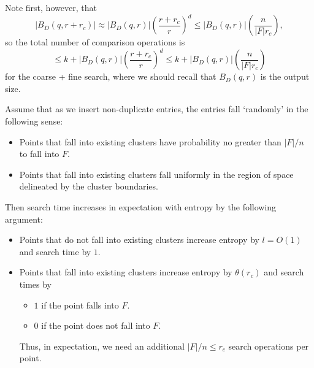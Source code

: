 \documentclass[review,preprint,12pt]{elsarticle}
\theoremstyle{definition}
\theoremstyle{remark}
\numberwithin{equation}{section}
\begin{document}
Note first, however, that
\[
    \left|B_D(q, r+r_c)\right| \approx \left|B_D(q,r)\right|\left(\frac{r+r_c}{r}\right)^d  \le \left|B_D(q,r)\right| \left( \frac{n }{|F| r_c} \right) ,
\]
so the total number of comparison operations is 
\[
    \le k + |B_D(q,r)| \left( \frac{r+r_c}{r} \right)^d   \le k + |B_D(q,r)| \left( \frac{n}{|F|r_c} \right)
\]
for the coarse + fine search, where we should recall that $B_D(q,r)$ is the output size.



Assume that as we insert non-duplicate entries, the entries fall `randomly' in the following sense:
\begin{itemize}
    \item Points that fall into existing clusters have probability no greater than $|F|/n$ to fall into $F$.
    \item Points that fall into existing clusters fall uniformly in the region of space delineated by the cluster boundaries.
\end{itemize}
Then search time increases in expectation with entropy by the following argument:
\begin{itemize}
    \item Points that do not fall into existing clusters increase entropy by $l = O(1)$  and search time by $1$.
    \item Points that fall into existing clusters increase entropy by $\theta(r_c)$ and search times by
        \begin{itemize}
            \item $1$ if the point falls into $F$.
            \item $0$ if the point does not fall into $F$.
        \end{itemize}
        Thus, in expectation, we need an additional $|F|/n \le r_c$ search operations per point.
\end{itemize}
\end{document}

